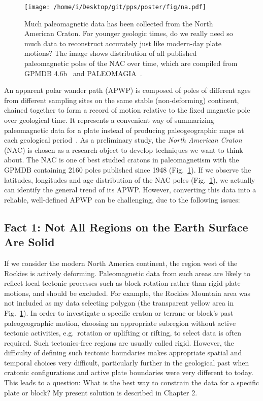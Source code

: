 \begin{figure}
\centering
\texttt{[image: /home/i/Desktop/git/pps/poster/fig/na.pdf]}
\captionsetup{width=.95\textwidth}
\caption{Much paleomagnetic data has been collected from the North American
Craton. For younger geologic times, do we really need so much data to
reconstruct accurately just like modern-day plate motions? The image shows
distribution of all published paleomagnetic poles of the NAC over time, which
are compiled from GPMDB 4.6b~\citep{P05} and
PALEOMAGIA~\citep{V14}.}\label{Fig:chap_intro_nacpole}
\end{figure}

An apparent polar wander path (APWP) is composed of poles of different ages
from different sampling sites on the same stable (non-deforming) continent,
chained together to form a record of motion relative to the fixed magnetic pole
over geological time. It represents a convenient way of summarizing
paleomagnetic data for a plate instead of producing paleogeographic maps at
each geological period~\citep{T08}. As a preliminary study, the \emph{North
American Craton} (NAC) is chosen as a research object to develop techniques we
want to think about. The NAC is one of best studied cratons in paleomagnetism
with the GPMDB containing 2160 poles published since 1948
(Fig.~\ref{Fig:chap_intro_nacpole}). If we observe the latitudes, longitudes and
age distribution of the NAC poles (Fig.~\ref{Fig:chap_intro_nacpole}), we
actually can identify the general trend of its APWP\@. However, converting this
data into a reliable, well-defined APWP can be challenging, due to the following
issues:

\subsection{Fact 1: Not All Regions on the Earth Surface Are Solid}

If we consider the modern North America continent, the region west of the
Rockies is actively deforming. Paleomagnetic data from such areas are likely to
reflect local tectonic processes such as block rotation rather than rigid plate
motions, and should be excluded. For example, the Rockies Mountain area was not
included as my data selecting polygon (the transparent yellow area in
Fig.~\ref{Fig:chap_intro_nacpole}). In order to investigate a specific craton or
terrane or block's past paleogeographic motion, choosing an appropriate
subregion without active tectonic activities, e.g.\ rotation or uplifting or
rifting, to select data is often required. Such tectonics-free regions are
usually called rigid. However, the difficulty of defining such tectonic
boundaries makes appropriate spatial and temporal choices very difficult,
particularly further in the geological past when cratonic configurations and
active plate boundaries were very different to today. This leads to a question:
What is the best way to constrain the data for a specific plate or block? My
present solution is described in Chapter 2.

